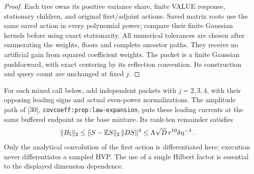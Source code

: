 \documentclass[11pt]{article}
\numberwithin{equation}{section}
\theoremstyle{remark}\newtheorem{remark}[theorem]{Remark}
\newcommand{\norm}[1]{\lVert#1\rVert}
\newcommand{\src}[1]{\texttt{\nolinkurl{#1}}}
\begin{document}
\begin{proof}
Each tree owns its positive variance share, finite VALUE response,
stationary children, and original first/adjoint actions. Saved matrix
roots use the same saved action in every polynomial power; compare
their finite Gaussian kernels before using exact stationarity.
All numerical tolerances are chosen after enumerating the weights,
floors and complete ancestor paths. They receive no artificial gain
from squared coefficient weights. The packet is a finite Gaussian
pushforward, with exact centering by its reflection convention.
Its construction and query count are unchanged at fixed $j$.
\end{proof}

For each mixed call below, add independent packets with $j=2,3,4$,
with their opposing leading signs and actual even-power normalizations.
The amplitude path of [30], \src{covcoeff:prop:law-expansion},
puts these leading currents at the same buffered endpoint as the base
mixture. Its rank-ten remainder satisfies
\[
 \norm{B_5}_2
 \le\norm{S-\E S}_2\,\norm{DS}^4
 \le\LL\sqrt D\,r^{10}\delta\eta^{-4}\,.
\]
Only the analytical convolution of the first action is differentiated
here; execution never differentiates a sampled HVP. The use of a single
Hilbert factor is essential to the displayed dimension dependence.
\end{document}
